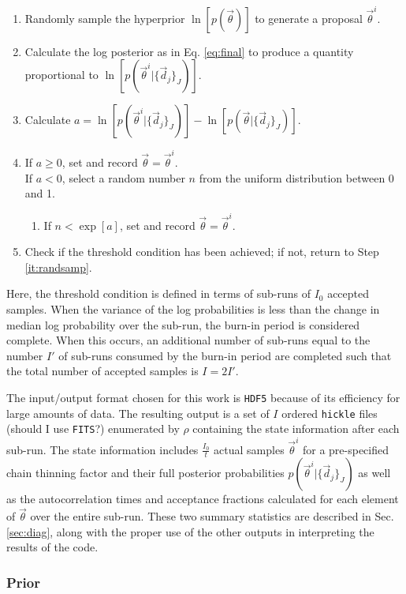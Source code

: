 \documentclass[preprint]{aastex}
\begin{document}
\begin{enumerate}
\item \label{it:randsamp} Randomly sample the hyperprior $\ln[p(\vec{\theta})]$ 
to generate a proposal $\vec{\theta}^{i}$.
\item Calculate the log posterior as in Eq. \ref{eq:final} to produce a 
quantity proportional to $\ln[p(\vec{\theta}^{i}|\{\vec{d}_{j}\}_{J})]$.
\item Calculate 
$a=\ln[p(\vec{\theta}^{i}|\{\vec{d}_{j}\}_{J})]-\ln[p(\vec{\theta}|\{\vec{d}_{j}
\}_{J})]$.
\item If $a\geq0$, set and record $\vec{\theta}=\vec{\theta}^{i}$.\\
If $a<0$, select a random number $n$ from the uniform distribution between 0 
and 1.
\begin{enumerate}
\item If $n<\exp[a]$, set and record $\vec{\theta}=\vec{\theta}^{i}$.
\end{enumerate}
\item Check if the threshold condition has been achieved; if not, return to 
Step \ref{it:randsamp}.
\end{enumerate}

Here, the threshold condition is defined in terms of sub-runs of $I_{0}$ 
accepted samples.  When the variance of the log probabilities is less than the 
change in median log probability over the sub-run, the burn-in period is 
considered complete.  When this occurs, an additional number of sub-runs equal 
to the number $I'$ of sub-runs consumed by the burn-in period are completed 
such that the total number of accepted samples is $I=2I'$.  

The input/output format chosen for this work is \texttt{HDF5} because of its 
efficiency for large amounts of data.  The resulting output is a set of $I$ 
ordered \texttt{hickle} files (should I use \texttt{FITS}?) enumerated by 
$\rho$ containing the state information after each sub-run.  The state 
information includes $\frac{I_{0}}{t}$ actual samples $\vec{\theta}^{i}$ for a 
pre-specified chain thinning factor and their full posterior probabilities 
$p(\vec{\theta}^{i}|\{\vec{d}_{j}\}_{J})$ as well as the autocorrelation times 
and acceptance fractions calculated for each element of $\vec{\theta}$ over the 
entire sub-run.  These two summary statistics are described in Sec. 
\ref{sec:diag}, along with the proper use of the other outputs in interpreting 
the results of the code.

\clearpage
\subsubsection{Prior}
\label{sec:prior}
\end{document}
